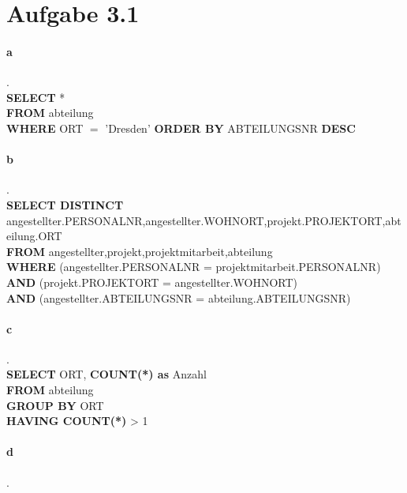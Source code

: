 \documentclass{article}
\begin{document}
	
	
	
	
	\section*{Aufgabe 3.1}
		\paragraph*{a}.\\
			\textbf{SELECT} *\\
			\textbf{FROM} abteilung\\
			\textbf{WHERE} ORT $=$ 'Dresden'
			\textbf{ORDER BY} ABTEILUNGSNR \textbf{DESC}
			
		\paragraph*{b}.\\
			\textbf{SELECT DISTINCT} angestellter.PERSONALNR,angestellter.WOHNORT,projekt.PROJEKTORT,abteilung.ORT\\
			\textbf{FROM} angestellter,projekt,projektmitarbeit,abteilung\\
			\textbf{WHERE} (angestellter.PERSONALNR = projektmitarbeit.PERSONALNR) \textbf{AND} (projekt.PROJEKTORT = angestellter.WOHNORT)\\ \textbf{AND} (angestellter.ABTEILUNGSNR = abteilung.ABTEILUNGSNR)
			
		\paragraph*{c}.\\
			\textbf{SELECT} ORT, \textbf{COUNT(*) as} Anzahl\\
			\textbf{FROM} abteilung\\
			\textbf{GROUP BY} ORT\\
			\textbf{HAVING COUNT(*)} > 1
			
		\paragraph*{d}.\\
			
			
			
\end{document}
